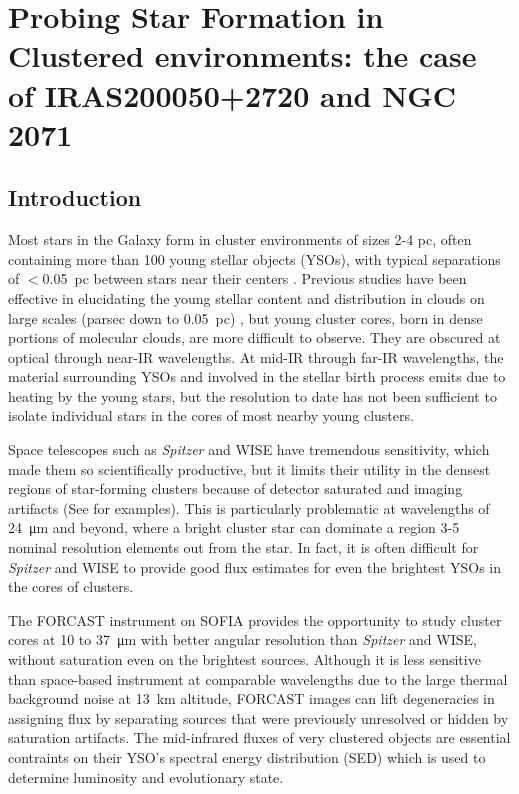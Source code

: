 \chapter{Probing Star Formation in Clustered environments: the case of IRAS200050+2720 and NGC 2071}

\label{chap:SOFIA}

\section{Introduction}
Most stars in the Galaxy form in cluster environments of sizes 2-4 pc, often containing more than 100 young stellar objects (YSOs), with typical separations of $<$0.05~pc between stars near their centers \citep{Porras:2003kxa, Allen:2007wqa, Gutermuth:2009gca}.
Previous studies have been effective in elucidating the young stellar content and distribution in clouds on large scales (parsec down to 0.05~pc) \citep{Evans-ARAA2012}, but young cluster cores, born in dense portions of molecular clouds, are more difficult to observe. They are obscured at optical through near-IR wavelengths. At mid-IR through far-IR wavelengths, the material surrounding YSOs and involved in the stellar birth process emits due to heating by the young stars, but the resolution to date has not been sufficient to isolate individual stars in the cores of most nearby young clusters.

Space telescopes such as \textit{Spitzer} and WISE have tremendous sensitivity, which made them so scientifically productive, but it limits their utility in the densest regions of star-forming clusters because of detector saturated and imaging artifacts (See \citep{2008ApJ...672.1013P} for examples). This is particularly problematic at wavelengths of \SI{24}{\micro\meter} and beyond, where a bright cluster star can dominate a region 3-5 nominal resolution elements out from the star. In fact, it is often difficult for \textit{Spitzer} and WISE to provide good flux estimates for even the brightest YSOs in the cores of clusters.

The FORCAST instrument on SOFIA provides the opportunity to study cluster cores at 10 to \SI{37}{\micro\meter} with better angular resolution than \textit{Spitzer} and WISE, without saturation even on the brightest sources. Although it is less sensitive than space-based instrument at comparable wavelengths due to the large thermal background noise at 13~km altitude, FORCAST images can lift degeneracies in assigning flux by separating sources that were previously unresolved or hidden by saturation artifacts. The mid-infrared fluxes of very clustered objects are essential contraints on their YSO's spectral energy distribution (SED) which is used to determine luminosity and evolutionary state.

